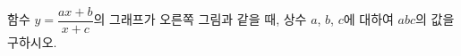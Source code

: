 \noindent\begin{minipage}[t]{0.58\linewidth}\vspace{0pt}\raggedright 함수 $y=\dfrac{ax+b}{x+c}$의 그래프가 오른쪽 그림과 같을 때, 상수 $a$, $b$, $c$에 대하여 $abc$의 값을 구하시오.\end{minipage}\hfill\begin{minipage}[t]{0.4\linewidth}\vspace{0pt}\centering \resizebox{\ifdim\width>\linewidth\linewidth\else\width\fi}{!}{}\end{minipage}\par
